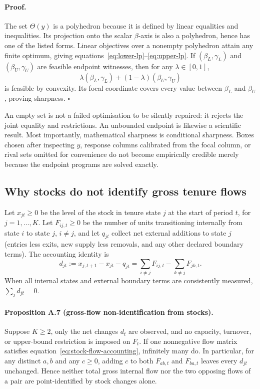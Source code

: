 \paragraph{Proof.}
The set \(\Theta(y)\) is a polyhedron because it is defined by linear
equalities and inequalities. Its projection onto the scalar \(\beta\)-axis is
also a polyhedron, hence has one of the listed forms. Linear objectives over a
nonempty polyhedron attain any finite optimum, giving
equations~\eqref{eq:lower-lp}--\eqref{eq:upper-lp}. If
\((\beta_L,\gamma_L)\) and \((\beta_U,\gamma_U)\) are feasible endpoint
witnesses, then for any \(\lambda\in[0,1]\),
\[
  \lambda(\beta_L,\gamma_L)
  +(1-\lambda)(\beta_U,\gamma_U)
\]
is feasible by convexity. Its focal coordinate covers every value between
\(\beta_L\) and \(\beta_U\), proving sharpness.
\(\square\)

An empty set is not a failed optimisation to be silently repaired: it rejects
the joint equality and restrictions. An unbounded endpoint is likewise a
scientific result. Most importantly, mathematical sharpness is conditional
sharpness. Boxes chosen after inspecting \(y\), response columns calibrated
from the focal column, or rival sets omitted for convenience do not become
empirically credible merely because the endpoint programs are solved exactly.

\subsection{Why stocks do not identify gross tenure flows}
\label{app:stock-flow}

Let \(x_{jt}\geq0\) be the level of the stock in tenure state \(j\) at the
start of period \(t\), for \(j=1,\ldots,K\). Let \(F_{ij,t}\geq0\) be the
number of units transitioning internally from state \(i\) to state \(j\),
\(i\neq j\), and let \(q_{jt}\) collect net external additions to state \(j\)
(entries less exits, new supply less removals, and any other declared boundary
terms). The accounting identity is
\begin{equation}
  d_{jt}
  :=x_{j,t+1}-x_{jt}-q_{jt}
  =\sum_{i\neq j}F_{ij,t}-\sum_{k\neq j}F_{jk,t}.
  \label{eq:stock-flow-accounting}
\end{equation}
When all internal states and external boundary terms are consistently
measured, \(\sum_jd_{jt}=0\).

\paragraph{Proposition A.7 (gross-flow non-identification from stocks).}
Suppose \(K\geq2\), only the net changes \(d_t\) are observed, and no capacity,
turnover, or upper-bound restriction is imposed on \(F_t\). If one nonnegative
flow matrix satisfies equation~\eqref{eq:stock-flow-accounting}, infinitely
many do. In particular, for any distinct \(a,b\) and any \(c\geq0\), adding
\(c\) to both \(F_{ab,t}\) and \(F_{ba,t}\) leaves every \(d_{jt}\)
unchanged. Hence neither total gross internal flow nor the two opposing flows
of a pair are point-identified by stock changes alone.

